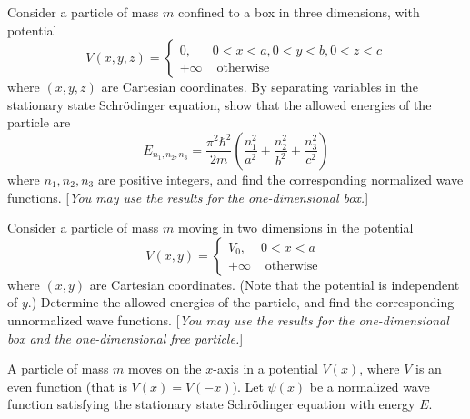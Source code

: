 \documentclass[answers]{exam}
\def\sech{\operatorname{sech}}
\begin{document}
\begin{questions}



\question%
Consider a particle of mass $m$ confined to a box in three dimensions, with potential \[
	V(x, y, z)= \begin{cases}0,&0<x<a, 0<y<b, 0<z<c \\ +\infty&\text{ otherwise}\end{cases}
\] where $(x, y, z)$ are Cartesian coordinates. By separating variables in the stationary state Schrödinger equation, show that the allowed energies of the particle are \[
	E_{n_{1}, n_{2}, n_{3}}=\frac{\pi^{2} \hbar^{2}}{2 m}\left(\frac{n_{1}^{2}}{a^{2}}+\frac{n_{2}^{2}}{b^{2}}+\frac{n_{3}^{2}}{c^{2}}\right)
\] where $n_{1}, n_{2}, n_{3}$ are positive integers, and find the corresponding normalized wave functions. [\emph{You may use the results for the one-dimensional box.}]



\question%
Consider a particle of mass $m$ moving in two dimensions in the potential \[
	V(x, y)= \begin{cases}V_{0}, & 0<x<a \\ +\infty & \text { otherwise }\end{cases}
\] where $(x, y)$ are Cartesian coordinates. (Note that the potential is independent of $y$.) Determine the allowed energies of the particle, and find the corresponding unnormalized wave functions. [\emph{You may use the results for the one-dimensional box and the one-dimensional free particle.}]



\question%
A particle of mass $m$ moves on the $x$-axis in a potential $V(x)$, where $V$ is an even function (that is $V(x)=V(-x)$). Let $\psi(x)$ be a normalized wave function satisfying the stationary state Schrödinger equation with energy $E$.




\end{questions}
\end{document}
